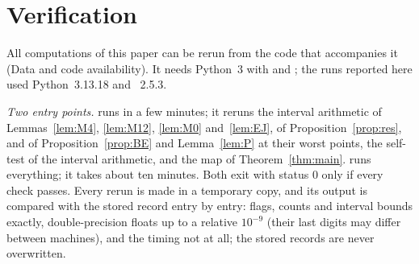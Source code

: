 \section{Verification}
\label{app:E}

All computations of this paper can be rerun from the code that accompanies it (Data and code availability).
It needs Python~3 with  and ; the runs reported here used Python~3.13.18 and ~2.5.3.

\emph{Two entry points.}
 runs in a few minutes; it reruns the interval arithmetic of Lemmas~\ref{lem:M4}, \ref{lem:M12}, \ref{lem:M0} and~\ref{lem:EJ}, of Proposition~\ref{prop:res}, and of Proposition~\ref{prop:BE} and Lemma~\ref{lem:P} at their worst points, the self-test of the interval arithmetic, and the map of Theorem~\ref{thm:main}.
 runs everything; it takes about ten minutes.
Both exit with status $0$ only if every check passes.
Every rerun is made in a temporary copy, and its output is compared with the stored record entry by entry: flags, counts and interval bounds exactly, double-precision floats up to a relative $10^{-9}$ (their last digits may differ between machines), and the timing not at all; the stored records are never overwritten.

